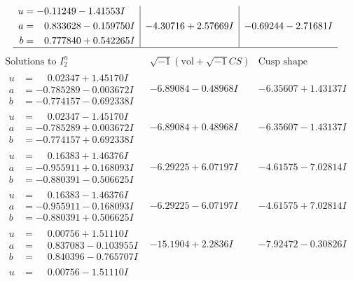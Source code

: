 \documentclass[1p]{elsarticle_modified}
\theoremstyle{definition}
\newcommand{\I}{\sqrt{-1}}
\begin{document}
$$\begin{array}{c|c|c}
\begin{aligned}
u &= -0.11249 - 1.41553 I \\
a &= \phantom{-}0.833628 - 0.159750 I \\
b &= \phantom{-}0.777840 + 0.542265 I\end{aligned}
 & -4.30716 + 2.57669 I & -0.69244 - 2.71681 I\\
 \hline 
 \end{array}$$\newpage$$\begin{array}{c|c|c}  
\text{Solutions to }I^u_{2}& \I (\text{vol} + \sqrt{-1}CS) & \text{Cusp shape}\\
 \hline 
\begin{aligned}
u &= \phantom{-}0.02347 + 1.45170 I \\
a &= -0.785289 - 0.003672 I \\
b &= -0.774157 - 0.692338 I\end{aligned}
 & -6.89084 - 0.48968 I & -6.35607 + 1.43137 I \\ \hline\begin{aligned}
u &= \phantom{-}0.02347 - 1.45170 I \\
a &= -0.785289 + 0.003672 I \\
b &= -0.774157 + 0.692338 I\end{aligned}
 & -6.89084 + 0.48968 I & -6.35607 - 1.43137 I \\ \hline\begin{aligned}
u &= \phantom{-}0.16383 + 1.46376 I \\
a &= -0.955911 + 0.168093 I \\
b &= -0.880391 - 0.506625 I\end{aligned}
 & -6.29225 + 6.07197 I & -4.61575 - 7.02814 I \\ \hline\begin{aligned}
u &= \phantom{-}0.16383 - 1.46376 I \\
a &= -0.955911 - 0.168093 I \\
b &= -0.880391 + 0.506625 I\end{aligned}
 & -6.29225 - 6.07197 I & -4.61575 + 7.02814 I \\ \hline\begin{aligned}
u &= \phantom{-}0.00756 + 1.51110 I \\
a &= \phantom{-}0.837083 - 0.103955 I \\
b &= \phantom{-}0.840396 - 0.765707 I\end{aligned}
 & -15.1904 + 2.2836 I & -7.92472 - 0.30826 I \\ \hline\begin{aligned}
u &= \phantom{-}0.00756 - 1.51110 I \\

\end{aligned}
\end{array}$$
\end{document}
